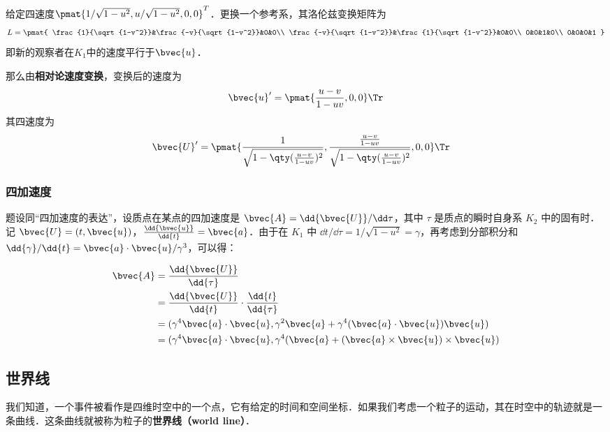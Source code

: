 给定四速度$\pmat{1/\sqrt{1-u^2}, u/\sqrt{1-u^2}, 0, 0}^T$．更换一个参考系，其洛伦兹变换矩阵为
\begin{equation}
L=
\pmat{
    \frac{1}{\sqrt{1-v^2}}&\frac{-v}{\sqrt{1-v^2}}&0&0\\
    \frac{-v}{\sqrt{1-v^2}}&\frac{1}{\sqrt{1-v^2}}&0&0\\
    0&0&1&0\\
    0&0&0&1
}
\end{equation}
即新的观察者在$K_1$中的速度平行于$\bvec{u}$．

那么由\textbf{相对论速度变换}，变换后的速度为
\begin{equation}
\bvec{u}' = \pmat{\frac{u-v}{1-uv}, 0, 0}\Tr
\end{equation}
其四速度为
\begin{equation}
\begin{aligned}
\bvec{U}' &= \pmat{ \frac{1}{\sqrt{1-\qty(\frac{u-v}{1-uv})^2}}, \frac{\frac{u-v}{1-uv}}{\sqrt{1-\qty(\frac{u-v}{1-uv})^2}}, 0, 0}\Tr
\end{aligned}
\end{equation}




\subsubsection{四加速度}

题设同“四加速度的表达”，设质点在某点的四加速度是 $\bvec{A}=\dd{\bvec{U}}/\dd\tau$，其中 $\tau$ 是质点的瞬时自身系 $K_2$ 中的固有时．记 $\bvec{U}=(t, \bvec{u})$，$\frac{\dd{\bvec{u}}}{\dd{t}}=\bvec{a}$．由于在 $K_1$ 中 $\dd{t}/\dd{\tau}=1/\sqrt{1-u^2}=\gamma$，再考虑到分部积分和 $\dd{\gamma}/\dd{t}=\bvec{a}\cdot\bvec{u}/\gamma^3$，可以得：

\begin{equation}
\begin{aligned}
%
\bvec{A}&=\frac{\dd{\bvec{U}}}{\dd{\tau}}\\&=\frac{\dd{\bvec{U}}}{\dd{t}}\cdot\frac{\dd{t}}{\dd{\tau}}\\&=(\gamma^4\bvec{a}\cdot\bvec{u}, \gamma^2\bvec{a}+\gamma^4(\bvec{a}\cdot\bvec{u})\bvec{u})\\&=(\gamma^4\bvec{a}\cdot\bvec{u}, \gamma^4(\bvec{a}+(\bvec{a}\times\bvec{u})\times\bvec{u})
%
\end{aligned}
\end{equation}

\subsection{世界线}

我们知道，一个事件被看作是四维时空中的一个点，它有给定的时间和空间坐标．如果我们考虑一个粒子的运动，其在时空中的轨迹就是一条曲线．这条曲线就被称为粒子的\textbf{世界线（world line）}．


